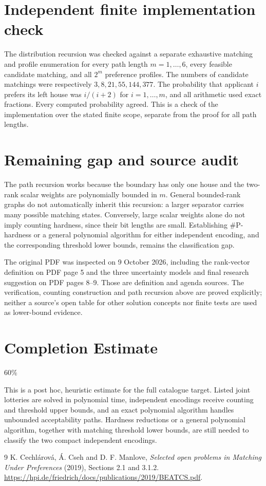 \documentclass[11pt]{article}
\theoremstyle{remark}
\begin{document}
\section{Independent finite implementation check}
The distribution recursion was checked against a separate exhaustive matching and profile enumeration for every path length $m=1,\ldots,6$, every feasible candidate matching, and all $2^m$ preference profiles. The numbers of candidate matchings were respectively $3,8,21,55,144,377$. The probability that applicant $i$ prefers its left house was $i/(i+2)$ for $i=1,\ldots,m$, and all arithmetic used exact fractions. Every computed probability agreed. This is a check of the implementation over the stated finite scope, separate from the proof for all path lengths.

\section{Remaining gap and source audit}
The path recursion works because the boundary has only one house and the two-rank scalar weights are polynomially bounded in $m$. General bounded-rank graphs do not automatically inherit this recursion: a larger separator carries many possible matching states. Conversely, large scalar weights alone do not imply counting hardness, since their bit lengths are small. Establishing \#P-hardness or a general polynomial algorithm for either independent encoding, and the corresponding threshold lower bounds, remains the classification gap.

The original PDF \cite{ccm} was inspected on 9 October 2026, including the rank-vector definition on PDF page 5 and the three uncertainty models and final research suggestion on PDF pages 8--9. Those are definition and agenda sources. The verification, counting construction and path recursion above are proved explicitly; neither a source's open table for other solution concepts nor finite tests are used as lower-bound evidence.

\section{Completion Estimate}
60\%

This is a post hoc, heuristic estimate for the full catalogue target.
Listed joint lotteries are solved in polynomial time, independent encodings receive counting and threshold upper bounds, and an exact polynomial algorithm handles unbounded acceptability paths. Hardness reductions or a general polynomial algorithm, together with matching threshold lower bounds, are still needed to classify the two compact independent encodings.

\begin{thebibliography}{9}
 K. Cechl\'arov\'a, \'A. Cseh and D. F. Manlove, \emph{Selected open problems in Matching Under Preferences} (2019), Sections 2.1 and 3.1.2. \url{https://hpi.de/friedrich/docs/publications/2019/BEATCS.pdf}.
\end{thebibliography}
\end{document}
